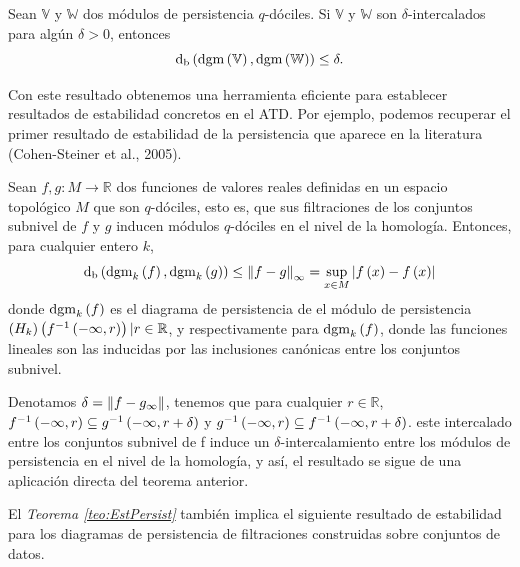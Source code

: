 \begin{teorema}\label{teo:EstPersist}
    Sean $\mathbb{V}$ y $\mathbb{W}$ dos m\'odulos de persistencia $q$-d\'ociles.
    Si $\mathbb{V}$ y $\mathbb{W}$ son $\delta$-intercalados para alg\'un $\delta>0$,
    entonces
    \begin{equation*}
        \mathrm{d}_{\mathrm{b}}
        \left(\mathrm{dgm}\left(\mathbb{V}\right),\mathrm{dgm}\left(\mathbb{W}\right)\right)\leq\delta.
    \end{equation*}
\end{teorema}

Con este resultado obtenemos una herramienta eficiente para establecer resultados de
estabilidad concretos en el ATD. Por ejemplo, podemos recuperar el primer resultado de
estabilidad de la persistencia que aparece en la literatura
(Cohen-Steiner et al., 2005)\cite{Cohen2005}.

\begin{teorema}
    Sean $f,g:M\rightarrow\mathbb{R}$ dos funciones de valores reales definidas en un
    espacio topol\'ogico $M$ que son $q$-d\'ociles, esto es, que sus filtraciones de
    los conjuntos subnivel de $f$ y $g$ inducen m\'odulos $q$-d\'ociles en el nivel de
    la homolog\'ia. Entonces, para cualquier entero $k$,
    \begin{equation*}
        \mathrm{d}_{\mathrm{b}}
        \left(\mathrm{dgm}_{k}\left(f\right),\mathrm{dgm}_{k}\left(g\right)\right)\leq
        \left\|f-g\right\|_{\infty}=
        \sup_{x\in M}\left|f\left(x\right)-f\left(x\right)\right|
    \end{equation*}
    donde $\mathrm{dgm}_{k}\left(f\right)$ es el diagrama de persistencia de el m\'odulo
    de persistencia $\left(H_{k}\right)\left(f^{-1}\left(-\infty,r\right)\right)|r\in\mathbb{R}$,
    y respectivamente para $\mathrm{dgm}_{k}\left(f\right)$,
    donde las funciones lineales son las inducidas por las inclusiones can\'onicas
    entre los conjuntos subnivel.
\end{teorema}
\begin{prueba}
    Denotamos $\delta=\left\|f-g_{\infty}\right\|$, tenemos que para cualquier $r\in\mathbb{R}$,
    $f^{-1}\left(-\infty,r\right)\subseteq g^{-1}\left(-\infty,r+\delta\right)$ y
    $g^{-1}\left(-\infty,r\right)\subseteq f^{-1}\left(-\infty,r+\delta\right)$.
    este intercalado entre los conjuntos subnivel de f induce un $\delta$-intercalamiento
    entre los m\'odulos de persistencia en el nivel de la homolog\'ia,
    y as\'i, el resultado se sigue de una aplicaci\'on directa del teorema anterior.
\end{prueba}

El \emph{Teorema \ref{teo:EstPersist}} tambi\'en implica el siguiente resultado
de estabilidad para los diagramas de persistencia de filtraciones construidas sobre
conjuntos de datos.